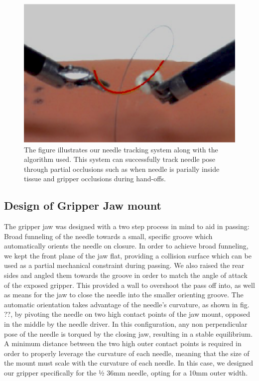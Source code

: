 \begin{figure}[!t]
\centering
\includegraphics[width=0.9\linewidth]{figures/needleTrack}
\caption{The figure illustrates our needle tracking system along with the algorithm used. This system can successfully track needle pose through partial occlusions such as when needle is parially inside tissue and gripper occlusions during hand-offs.}
\label{fig:tracking}
\vspace{-10pt}
\end{figure}


\subsection{Design of Gripper Jaw mount}

The gripper jaw was designed with a two step process in mind to aid in passing: Broad funneling of the needle towards a small, specific groove which automatically orients the needle on closure.
	In order to achieve broad funneling, we kept the front plane of the jaw flat, providing a collision surface which can be used as a partial mechanical constraint during passing. We also raised the rear sides and angled them towards the groove in order to match the angle of attack of the exposed gripper. This provided a wall to overshoot the pass off into, as well as means for the jaw to close the needle into the smaller orienting groove. 
	The automatic orientation takes advantage of the needle’s curvature, as shown in fig. ??, by pivoting the needle on two high contact points of the jaw mount, opposed in the middle by the needle driver. In this configuration, any non perpendicular pose of the needle is torqued by the closing jaw, resulting in a stable equilibrium. A minimum distance between the two high outer contact points is required in order to properly leverage the curvature of each needle, meaning that the size of the mount must scale with the curvature of each needle. In this case, we designed our gripper specifically for the ½ 36mm needle, opting for a 10mm outer width.

